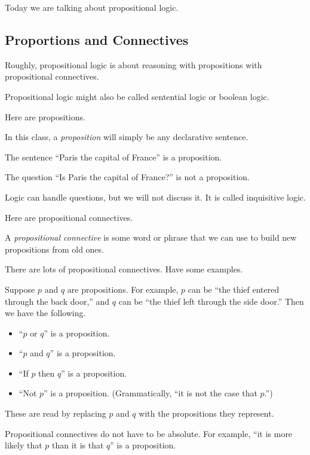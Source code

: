 \documentclass[../notes.tex]{subfiles}
\begin{document}


Today we are talking about propositional logic.

\subsection{Proportions and Connectives}
Roughly, propositional logic is about reasoning with propositions with propositional connectives.
\begin{remark}
	Propositional logic might also be called sentential logic or boolean logic.
\end{remark}
Here are propositions.
\begin{definition}[Proposition]
	In this class, a \textit{proposition} will simply be any declarative sentence.
\end{definition}
\begin{example}
	The sentence ``Paris the capital of France'' is a proposition.
\end{example}
\begin{nex}
	The question ``Is Paris the capital of France?'' is not a proposition.
\end{nex}
\begin{remark}
	Logic can handle questions, but we will not discuss it. It is called inquisitive logic.
\end{remark}
Here are propositional connectives.
\begin{definition}[Connective]
	A \textit{propositional connective} is some word or phrase that we can use to build new propositions from old ones.
\end{definition}
There are lots of propositional connectives. Have some examples.
\begin{example}
	Suppose $p$ and $q$ are propositions. For example, $p$ can be ``the thief entered through the back door,'' and $q$ can be ``the thief left through the side door.'' Then we have the following.
	\begin{itemize}
		\item ``$p$ or $q$'' is a proposition.
		\item ``$p$ and $q$'' is a proposition.
		\item ``If $p$ then $q$'' is a proposition.
		\item ``Not $p$'' is a proposition. (Grammatically, ``it is not the case that $p$.'')
	\end{itemize}
	These are read by replacing $p$ and $q$ with the propositions they represent.
\end{example}
\begin{example}
	Propositional connectives do not have to be absolute. For example, ``it is more likely that $p$ than it is that $q$'' is a proposition.
\end{example}
\end{document}
